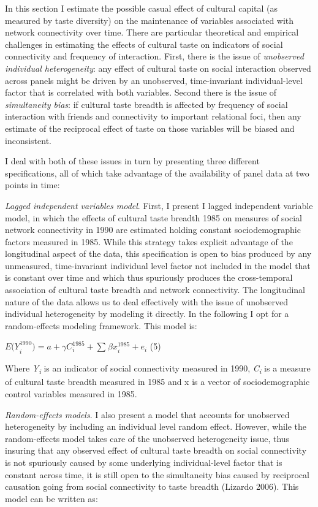 In this section I estimate the possible casual effect of cultural capital (as measured by taste diversity) on the maintenance of variables associated with network connectivity over time. There are particular theoretical and empirical challenges in estimating the effects of cultural taste on indicators of social connectivity and frequency of interaction. First, there is the issue of \emph{unobserved individual heterogeneity}: any effect of cultural taste on social interaction observed across panels might be driven by an unobserved, time-invariant individual-level factor that is correlated with both variables. Second there is the issue of \emph{simultaneity bias}: if cultural taste breadth is affected by frequency of social interaction with friends and connectivity to important relational foci, then any estimate of the reciprocal effect of taste on those variables will be biased and inconsistent.

I deal with both of these issues in turn by presenting three different specifications, all of which take advantage of the availability of panel data at two points in time:

\emph{Lagged independent variables model}. First, I present I lagged independent variable model, in which the effects of cultural taste breadth 1985 on measures of social network connectivity in 1990 are estimated holding constant sociodemographic factors measured in 1985. While this strategy takes explicit advantage of the longitudinal aspect of the data, this specification is open to bias produced by any unmeasured, time-invariant individual level factor not included in the model that is constant over time and which thus spuriously produces the cross-temporal association of cultural taste breadth and network connectivity. The longitudinal nature of the data allows us to deal effectively with the issue of unobserved individual heterogeneity by modeling it directly. In the following I opt for a random-effects modeling framework. This model is:

\({E(Y}_{i}^{1990}) = a + \gamma C_{i}^{1985} + \sum_{}^{}{\beta x_{i}^{1985} + e_{i}}\) (5)

Where \emph{Y\textsubscript{i}} is an indicator of social connectivity measured in 1990, \emph{C\textsubscript{i}} is a measure of cultural taste breadth measured in 1985 and x is a vector of sociodemographic control variables measured in 1985.

\emph{Random-effects models}. I also present a model that accounts for unobserved heterogeneity by including an individual level random effect. However, while the random-effects model takes care of the unobserved heterogeneity issue, thus insuring that any observed effect of cultural taste breadth on social connectivity is not spuriously caused by some underlying individual-level factor that is constant across time, it is still open to the simultaneity bias caused by reciprocal causation going from social connectivity to taste breadth (Lizardo 2006). This model can be written as:

